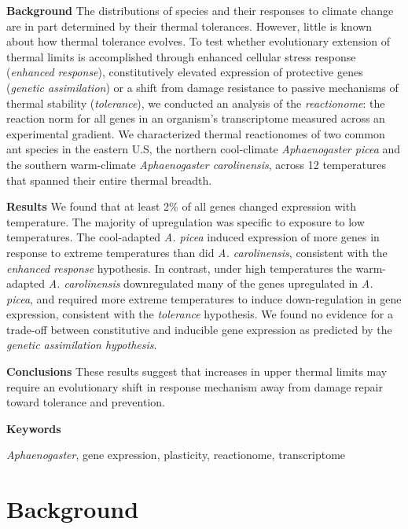 \documentclass[]{article}
\begin{document}
\textbf{Background} The distributions of species and their responses to
climate change are in part determined by their thermal tolerances.
However, little is known about how thermal tolerance evolves. To test
whether evolutionary extension of thermal limits is accomplished through
enhanced cellular stress response (\emph{enhanced response}),
constitutively elevated expression of protective genes (\emph{genetic
assimilation}) or a shift from damage resistance to passive mechanisms
of thermal stability (\emph{tolerance}), we conducted an analysis of the
\emph{reactionome}: the reaction norm for all genes in an organism's
transcriptome measured across an experimental gradient. We characterized
thermal reactionomes of two common ant species in the eastern U.S, the
northern cool-climate \emph{Aphaenogaster picea} and the southern
warm-climate \emph{Aphaenogaster carolinensis}, across 12 temperatures
that spanned their entire thermal breadth.

\textbf{Results} We found that at least 2\% of all genes changed
expression with temperature. The majority of upregulation was specific
to exposure to low temperatures. The cool-adapted \emph{A. picea}
induced expression of more genes in response to extreme temperatures
than did \emph{A. carolinensis}, consistent with the \emph{enhanced
response} hypothesis. In contrast, under high temperatures the
warm-adapted \emph{A. carolinensis} downregulated many of the genes
upregulated in \emph{A. picea}, and required more extreme temperatures
to induce down-regulation in gene expression, consistent with the
\emph{tolerance} hypothesis. We found no evidence for a trade-off
between constitutive and inducible gene expression as predicted by the
\emph{genetic assimilation hypothesis}.

\textbf{Conclusions} These results suggest that increases in upper
thermal limits may require an evolutionary shift in response mechanism
away from damage repair toward tolerance and prevention.

\textbf{Keywords}

\emph{Aphaenogaster}, gene expression, plasticity, reactionome,
transcriptome

\section{Background}\label{background}
\end{document}
